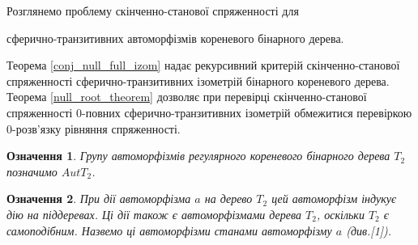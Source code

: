 \documentclass[a4paper,12pt]{article} \usepackage{a4wide}
\numberwithin{equation}{subsection}
\newtheorem{theorem}{Теорема}[subsection]
\newtheorem{lemma}{Лема}[subsection]
\newtheorem{definition}{Означення}[subsection]
\begin{document}







Розглянемо
 проблему скінченно-станової спряженності для

 сферично-транзитивних
  автоморфізмів кореневого бінарного дерева.

 Теорема
  \ref{conj_null_full_izom} надає рекурсивний критерій
  скінченно-станової спряженності  сферично-транзитивних ізометрій бінарного кореневого дерева.
  Теорема \ref{null_root_theorem} дозволяє при перевірці
  скінченно-станової спряженності $0$-повних сферично-транзитивних ізометрій обмежитися перевіркою
  $0$-розв'язку рівняння спряженності.


\begin{definition}
  Групу автоморфізмів регулярного кореневого бінарного дерева  $T_2$ позначимо
  $AutT_2$.
\end{definition}

\begin{definition}
  При дії автоморфізма $a$ на дерево $T_2$ цей автоморфізм індукує дію на піддеревах. Ці дії також є автоморфізмами дерева $T_2$, оскільки $T_2$ є самоподібним.  Назвемо ці автоморфізми станами автоморфізму $a$ (див.[1]).

\end{definition}
\end{document}
